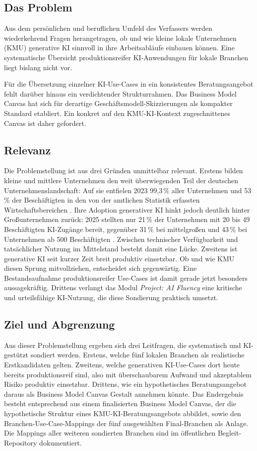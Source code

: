 \documentclass[a4paper,11pt]{article}
\begin{document}
\subsection{Das Problem}
Aus dem persönlichen und beruflichen Umfeld des Verfassers werden
wiederkehrend Fragen herangetragen, ob und wie kleine lokale Unternehmen
(KMU) generative KI sinnvoll in ihre Arbeitsabläufe einbauen können.
Eine systematische Übersicht produktionsreifer KI-Anwendungen für lokale
Branchen liegt bislang nicht vor.

Für die Übersetzung einzelner KI-Use-Cases in ein konsistentes
Beratungsangebot fehlt darüber hinaus ein verdichtender Strukturrahmen.
Das Business Model Canvas hat sich für derartige
Geschäftsmodell-Skizzierungen als kompakter Standard etabliert. Ein
konkret auf den KMU-KI-Kontext zugeschnittenes Canvas ist daher
gefordert.

\subsection{Relevanz}
Die Problemstellung ist aus drei Gründen unmittelbar relevant. Erstens
bilden kleine und mittlere Unternehmen den weit überwiegenden Teil der
deutschen Unternehmenslandschaft: Auf sie entfielen 2023 99{,}3\,\% aller
Unternehmen und 53\,\% der Beschäftigten in den von der amtlichen
Statistik erfassten Wirtschaftsbereichen
\parencite{destatis_kmu_beschaeftigte}. Ihre Adoption generativer KI
hinkt jedoch deutlich hinter Großunternehmen zurück: 2025 stellten nur
21\,\% der Unternehmen mit 20 bis 49 Beschäftigten KI-Zugänge bereit,
gegenüber 31\,\% bei mittelgroßen und 43\,\% bei Unternehmen ab 500
Beschäftigten \parencite{bitkom2025ki}. Zwischen technischer
Verfügbarkeit und tatsächlicher Nutzung im Mittelstand besteht damit
eine Lücke. Zweitens ist generative KI seit kurzer Zeit breit produktiv
einsetzbar. Ob und wie KMU diesen Sprung mitvollziehen, entscheidet
sich gegenwärtig. Eine Bestandsaufnahme produktionsreifer Use-Cases ist
damit gerade jetzt besonders aussagekräftig. Drittens verlangt das
Modul \emph{Project: AI Fluency} eine kritische und urteilsfähige
KI-Nutzung, die diese Sondierung praktisch umsetzt.

\subsection{Ziel und Abgrenzung}
Aus dieser Problemstellung ergeben sich drei Leitfragen, die
systematisch und KI-gestützt sondiert werden. Erstens, welche fünf
lokalen Branchen als realistische Erstkandidaten gelten. Zweitens,
welche generativen KI-Use-Cases dort heute bereits produktionsreif
sind, also mit überschaubarem Aufwand und akzeptablem Risiko produktiv
einsetzbar. Drittens, wie ein hypothetisches Beratungsangebot daraus
als Business Model Canvas Gestalt annehmen könnte. Das Endergebnis besteht
entsprechend aus einem finalisierten Business Model Canvas, der die
hypothetische Struktur eines KMU-KI-Beratungsangebots abbildet, sowie
den Branchen-Use-Case-Mappings der fünf ausgewählten Final-Branchen
als Anlage. Die Mappings aller weiteren sondierten Branchen sind im
öffentlichen Begleit-Repository dokumentiert.
\end{document}
